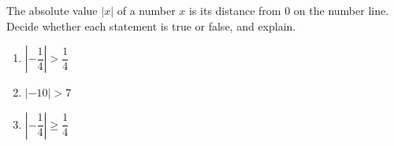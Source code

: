 The absolute value $|x|$ of a number $x$ is its distance from $0$ on the number line. Decide whether each statement is true or false, and explain.
\begin{enumerate}
\item[(a)] $\left|-\dfrac{1}{4}\right|>\dfrac{1}{4}$
\item[(b)] $|-10|>7$
\item[(c)] $\left|-\dfrac{1}{4}\right|\ge\dfrac{1}{4}$
\end{enumerate}
